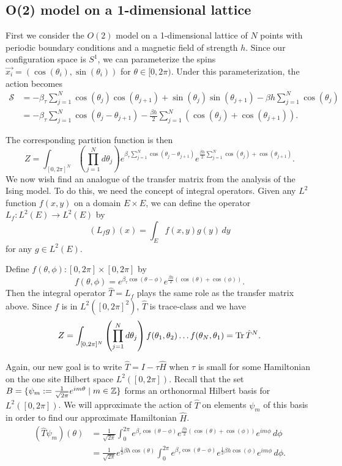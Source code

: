 \documentclass[11pt,reqno]{amsart}
\begin{document}
	\subsection{O(2) model on a 1-dimensional lattice}
	
	First we consider the $O(2)$ model on a 1-dimensional lattice of $N$ points with periodic boundary conditions and a magnetic field of strength $h$.
	Since our configuration space is $S^1$, we can parameterize the spins $\vec{x_i}=(\cos(\theta_i),\sin(\theta_i))$ for $\theta \in [0,2\pi)$. 
	Under this parameterization, the action becomes
	\begin{align*}
		 \mathcal{S} &= -\beta_\tau \sum_{j=1}^N \cos(\theta_j)\cos(\theta_{j+1})+\sin(\theta_j)\sin(\theta_{j+1}) - \beta h  \sum_{j=1}^N \cos(\theta_j)\\
			&=  - \beta_\tau \sum_{j=1}^N \cos(\theta_j-\theta_{j+1}) - \frac{\beta h}{2}  \sum_{j=1}^N \left(\cos(\theta_j)+\cos(\theta_{j+1})\right). 
	\end{align*}
	
	The corresponding partition function is then
	\[ Z = \int_{[0,2\pi]^N} \left(\prod_{j=1}^N d\theta_j \right) e^{\beta_\tau \sum_{j=1}^N \cos(\theta_j-\theta_{j+1})} e^{\frac{\beta h}{2}  \sum_{j=1}^N \cos(\theta_j)+\cos(\theta_{j+1})}. \]
	We now wish find an analogue of the transfer matrix from the analysis of the Ising model.
	To do this, we need the concept of integral operators.
	Given any $L^2$ function $f(x,y)$ on a domain $E\times E$, we can define the operator $L_f : L^2(E) \to L^2(E)$ by 
	\[(L_f g)(x)=\int_E f(x,y)g(y)\, dy \]
	for any $g \in L^2(E)$.
	
	Define $f(\theta,\phi): [0,2\pi]\times [0,2\pi]$ by 
	\[f(\theta,\phi)=e^{\beta_\tau \cos(\theta -\phi)}e^{\frac{\beta h}{2}(\cos(\theta)+\cos(\phi))}. \]
	Then the integral operator $\hat{T}=L_f$ plays the same role as the transfer matrix above.
	Since $f$ is in $L^2([0,2\pi]^2)$, $\hat{T}$ is trace-class and we have
	\[Z= \int_{[0,2\pi]^N} \left(\prod_{j=1}^N d\theta_j \right) f(\theta_1,\theta_2)\ldots f(\theta_N,\theta_1) = \Tr \hat{T}^N. \]
	
	Again, our new goal is to write $\hat{T}=I-\tau\hat{H}$ when $\tau$ is small for some Hamiltonian on the one site Hilbert space $L^2([0,2\pi])$. 
	Recall that the set $B=\{\psi_m:=\frac{1}{\sqrt{2\pi}} e^{im\theta} \mid m \in \mathbb{Z} \}$ forms an orthonormal Hilbert basis for $L^2([0,2\pi])$.
	We will approximate the action of $\hat{T}$ on elements $\psi_m$ of this basis in order to find our approximate Hamiltonian $\hat{H}$.
	\begin{align}
		(\hat{T}\psi_m)(\theta) &= \frac{1}{\sqrt{2\pi}}\int_{0}^{2\pi} e^{\beta_\tau \cos(\theta -\phi)}e^{\frac{\beta h}{2}(\cos(\theta)+\cos(\phi))} e^{im\phi}\, d\phi \nonumber \\
		&=\frac{1}{\sqrt{2\pi}}e^{\frac{1}{2}\beta h \cos(\theta)} \int_{0}^{2\pi} e^{\beta_\tau \cos(\theta -\phi)}e^{\frac{1}{2}\beta h \cos(\phi)}e^{im\phi}\, d\phi. \label{eq:1+0_O(2)_IntOperator}
	\end{align}
	
\end{document}
